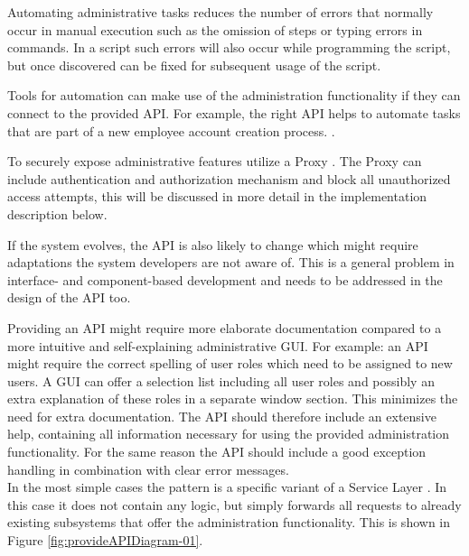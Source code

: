 Automating administrative tasks reduces the number of errors that normally occur in manual execution such as the omission of steps or typing errors in commands. In a script such errors will also occur while programming the script, but once discovered can be fixed for subsequent usage of the script.

Tools for automation can make use of the administration functionality if they can connect to the provided API. For example, the right API helps to automate tasks that are part of a new employee account creation process. \cite{Limoncelli2011a}.

To securely expose administrative features utilize a {\sc Proxy} \cite{Buschmann1996}. The {\sc Proxy} can include authentication and authorization mechanism and block all unauthorized access attempts, this will be discussed in more detail in the implementation description below.

If the system evolves, the API is also likely to change which might require adaptations the system developers are not aware of. This is a general problem in interface- and component-based development and needs to be addressed in the design of the API too. 

Providing an API might require more elaborate documentation compared to a more intuitive and self-explaining administrative GUI. 
For example: an API might require the correct spelling
of user roles which need to be assigned to new users. A GUI can offer a selection list including all user roles and possibly an extra explanation of these roles in a separate window section. %
This minimizes the need for extra documentation. The API should therefore include an extensive help, containing all information necessary for using the provided administration functionality. For the same reason the API should include a good exception handling in combination with clear error messages. \\


In the most simple cases the pattern is a specific variant of a {\sc Service Layer} \cite{Fowler:2002:PEA:579257}. In this case it does not contain any logic, but simply forwards all requests to already existing subsystems that offer the administration functionality. This is shown in Figure \ref{fig:provideAPIDiagram-01}.  

